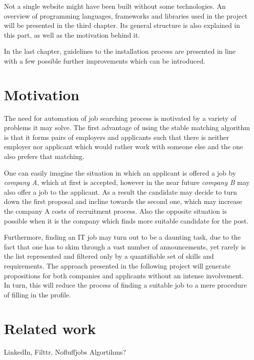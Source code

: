 Not a single website might have been built without some technologies. An overview of programming languages, frameworks and libraries used in the project will be presented in the third chapter. Its general structure is also explained in this part, as well as the motivation behind it.

In the last chapter, guidelines to the installation process are presented in line with a few possible further improvements which can be introduced.

\section{Motivation}
The need for automation of job searching process is motivated by a variety of problems it may solve. The first advantage of using the stable matching algorithm is that it forms pairs of employers and applicants such that there is neither employer nor applicant which would rather work with someone else and the one also prefers that matching.

One can easily imagine the situation in which an applicant is offered a job by \textit{company A}, which at first is accepted, however in the near future \textit{company B} may also offer a job to the applicant. As a result the candidate may decide to turn down the first proposal and incline towards the second one, which may increase the company A costs of recruitment process. Also the opposite situation is possible when it is the company which finds more suitable candidate for the post.

Furthermore, finding an IT job may turn out to be a daunting task, due to the fact that one has to skim through a vast number of announcements, yet rarely is the list represented and filtered only by a quantifiable set of skills and requirements. The approach presented in the following project will generate propositions for both companies and applicants without an intense involvement. In turn, this will reduce the process of finding a suitable job to a mere procedure of filling in the profile.

\section{Related work}
LinkedIn, Filttr, Nofluffjobs
Algortihms?

\section{}


